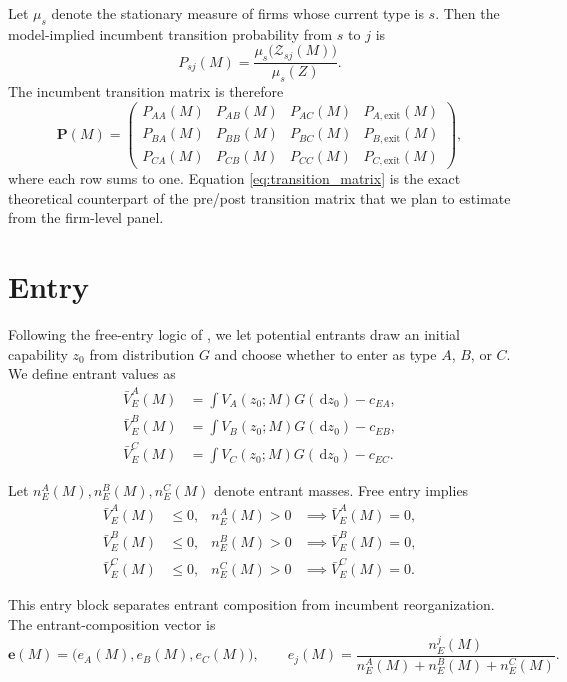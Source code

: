 \documentclass[12pt]{article}
\newcommand{\1}{\mathbf{1}}
\newcommand{\dd}{\,\mathrm{d}}
\begin{document}
Let $\mu_s$ denote the stationary measure of firms whose current type is $s$. Then the model-implied incumbent transition probability from $s$ to $j$ is
\begin{equation}
P_{sj}(M)=\frac{\mu_s\bigl(\mathcal Z_{sj}(M)\bigr)}{\mu_s(Z)}.
\label{eq:transition_prob}
\end{equation}
The incumbent transition matrix is therefore
\begin{equation}
\mathbf P(M)=
\begin{pmatrix}
P_{AA}(M) & P_{AB}(M) & P_{AC}(M) & P_{A,\mathrm{exit}}(M) \\
P_{BA}(M) & P_{BB}(M) & P_{BC}(M) & P_{B,\mathrm{exit}}(M) \\
P_{CA}(M) & P_{CB}(M) & P_{CC}(M) & P_{C,\mathrm{exit}}(M)
\end{pmatrix},
\label{eq:transition_matrix}
\end{equation}
where each row sums to one. Equation \eqref{eq:transition_matrix} is the exact theoretical counterpart of the pre/post transition matrix that we plan to estimate from the firm-level panel.

\section{Entry}

Following the free-entry logic of \citet{Hopenhayn1992}, we let potential entrants draw an initial capability $z_0$ from distribution $G$ and choose whether to enter as type $A$, $B$, or $C$. We define entrant values as
\begin{align}
\bar V_E^A(M)&=\int V_A(z_0;M)G(\dd z_0)-c_{EA}, \\
\bar V_E^B(M)&=\int V_B(z_0;M)G(\dd z_0)-c_{EB}, \\
\bar V_E^C(M)&=\int V_C(z_0;M)G(\dd z_0)-c_{EC}.
\end{align}

Let $n_E^A(M),n_E^B(M),n_E^C(M)$ denote entrant masses. Free entry implies
\begin{align}
\bar V_E^A(M) &\le 0, & n_E^A(M)>0 &\implies \bar V_E^A(M)=0, \\
\bar V_E^B(M) &\le 0, & n_E^B(M)>0 &\implies \bar V_E^B(M)=0, \\
\bar V_E^C(M) &\le 0, & n_E^C(M)>0 &\implies \bar V_E^C(M)=0.
\end{align}

This entry block separates entrant composition from incumbent reorganization. The entrant-composition vector is
\begin{equation}
\mathbf e(M)=\bigl(e_A(M),e_B(M),e_C(M)\bigr),
\qquad
e_j(M)=\frac{n_E^j(M)}{n_E^A(M)+n_E^B(M)+n_E^C(M)}.
\label{eq:entry_vector}
\end{equation}
\end{document}
